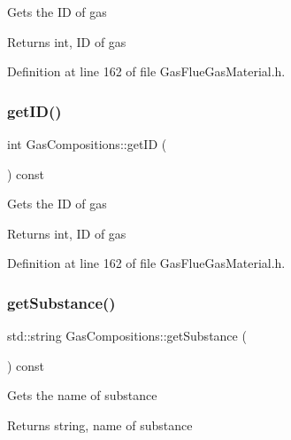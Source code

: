 Gets the ID of gas \begin{DoxyReturn}{Returns}
int, ID of gas 
\end{DoxyReturn}


Definition at line 162 of file Gas\+Flue\+Gas\+Material.\+h.

\mbox{\label{class_gas_compositions_a9668decdb2b5065c8ee3c59c207b9d51}} 
\subsubsection{\texorpdfstring{get\+I\+D()}{getID()}\hspace{0.1cm}{\footnotesize\ttfamily [3/3]}}
{\footnotesize\ttfamily int Gas\+Compositions\+::get\+ID (\begin{DoxyParamCaption}{ }\end{DoxyParamCaption}) const\hspace{0.3cm}{\ttfamily [inline]}}

Gets the ID of gas \begin{DoxyReturn}{Returns}
int, ID of gas 
\end{DoxyReturn}


Definition at line 162 of file Gas\+Flue\+Gas\+Material.\+h.

\mbox{\label{class_gas_compositions_abad9554bca9b68cd970eae11bdd3c505}} 
\subsubsection{\texorpdfstring{get\+Substance()}{getSubstance()}\hspace{0.1cm}{\footnotesize\ttfamily [1/3]}}
{\footnotesize\ttfamily std\+::string Gas\+Compositions\+::get\+Substance (\begin{DoxyParamCaption}{ }\end{DoxyParamCaption}) const}

Gets the name of substance \begin{DoxyReturn}{Returns}
string, name of substance 
\end{DoxyReturn}
\mbox{\label{class_gas_compositions_abad9554bca9b68cd970eae11bdd3c505}} 
